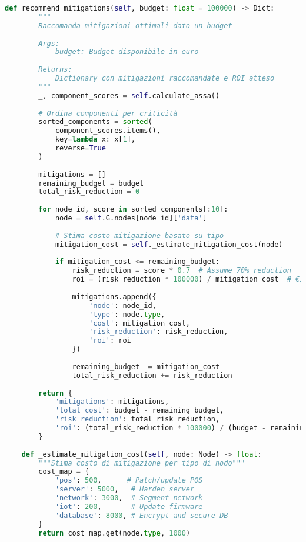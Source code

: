 \begin{lstlisting}[language=Python, caption=Implementazione dell'algoritmo ASSA-GDO]
    def recommend_mitigations(self, budget: float = 100000) -> Dict:
        """
        Raccomanda mitigazioni ottimali dato un budget
        
        Args:
            budget: Budget disponibile in euro
            
        Returns:
            Dictionary con mitigazioni raccomandate e ROI atteso
        """
        _, component_scores = self.calculate_assa()
        
        # Ordina componenti per criticità
        sorted_components = sorted(
            component_scores.items(), 
            key=lambda x: x[1], 
            reverse=True
        )
        
        mitigations = []
        remaining_budget = budget
        total_risk_reduction = 0
        
        for node_id, score in sorted_components[:10]:
            node = self.G.nodes[node_id]['data']
            
            # Stima costo mitigazione basato su tipo
            mitigation_cost = self._estimate_mitigation_cost(node)
            
            if mitigation_cost <= remaining_budget:
                risk_reduction = score * 0.7  # Assume 70% reduction
                roi = (risk_reduction * 100000) / mitigation_cost  # €100k per point
                
                mitigations.append({
                    'node': node_id,
                    'type': node.type,
                    'cost': mitigation_cost,
                    'risk_reduction': risk_reduction,
                    'roi': roi
                })
                
                remaining_budget -= mitigation_cost
                total_risk_reduction += risk_reduction
                
        return {
            'mitigations': mitigations,
            'total_cost': budget - remaining_budget,
            'risk_reduction': total_risk_reduction,
            'roi': (total_risk_reduction * 100000) / (budget - remaining_budget)
        }
    
    def _estimate_mitigation_cost(self, node: Node) -> float:
        """Stima costo di mitigazione per tipo di nodo"""
        cost_map = {
            'pos': 500,      # Patch/update POS
            'server': 5000,   # Harden server
            'network': 3000,  # Segment network
            'iot': 200,       # Update firmware
            'database': 8000, # Encrypt and secure DB
        }
        return cost_map.get(node.type, 1000)



\end{lstlisting}
